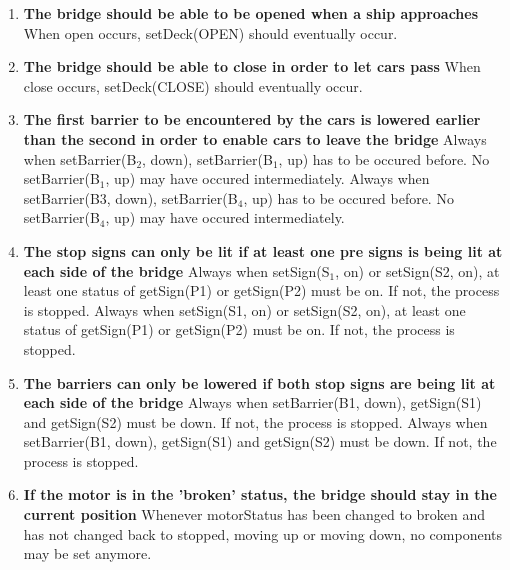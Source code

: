 \begin{enumerate}
	\item \textbf{The bridge should be able to be opened when a ship approaches}
	When open occurs, setDeck(OPEN) should eventually occur.

	\item \textbf{The bridge should be able to close in order to let cars pass}
	When close occurs, setDeck(CLOSE) should eventually occur.

	\item \textbf{The first barrier to be encountered by the cars is lowered earlier than the second in order to enable cars to leave the bridge}
	Always when setBarrier(B$_2$, down), setBarrier(B$_1$, up) has to be occured before. No setBarrier(B$_1$, up) may have occured intermediately.
	Always when setBarrier(B3, down), setBarrier(B$_4$, up) has to be occured before. No setBarrier(B$_4$, up) may have occured intermediately.
	
	\item \textbf{The stop signs can only be lit if at least one pre signs is being lit at each side of the bridge}
	Always when setSign(S$_1$, on) or setSign(S2, on), at least one status of getSign(P1) or getSign(P2) must be on. If not, the process is stopped.
	Always when setSign(S1, on) or setSign(S2, on), at least one status of getSign(P1) or getSign(P2) must be on. If not, the process is stopped.

	\item \textbf{The barriers can only be lowered if both stop signs are being lit at each side of the bridge}
	Always when setBarrier(B1, down), getSign(S1) and getSign(S2) must be down. If not, the process is stopped.
	Always when setBarrier(B1, down), getSign(S1) and getSign(S2) must be down. If not, the process is stopped.

	\item \textbf{If the motor is in the 'broken' status, the bridge should stay in the current position}
	Whenever motorStatus has been changed to broken and has not changed back to stopped, moving up or moving down, no components may be set anymore.

\end{enumerate}
